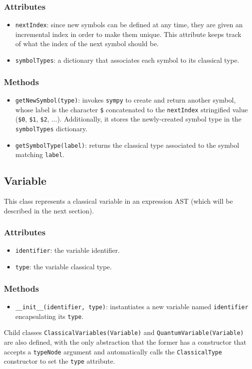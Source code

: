 \documentclass[12pt,a4paper]{report}
\theoremstyle{definition}
\theoremstyle{definition}
\theoremstyle{definition}
\begin{document}
\subsubsection{Attributes}
\begin{itemize}
    \itemsep 0em
    \item \texttt{nextIndex}: since new symbols can be defined at any time, they are given an incremental index in order to make them unique. This attribute keeps track of what the index of the next symbol should be.
    \item \texttt{symbolTypes}: a dictionary that associates each symbol to its classical type.
\end{itemize}
\subsubsection{Methods}
\begin{itemize}
    \itemsep 0em
    \item \texttt{getNewSymbol(type)}: invokes \texttt{sympy} to create and return another symbol, whose label is the character \texttt{\$} concatenated to the \texttt{nextIndex} stringified value (\texttt{\$0}, \texttt{\$1}, \texttt{\$2}, $\ldots$). Additionally, it stores the newly-created symbol type in the \texttt{symbolTypes} dictionary.
    \item \texttt{getSymbolType(label)}: returns the classical type associated to the symbol matching \texttt{label}.
\end{itemize}

\subsection{Variable}
This class represents a classical variable in an expression AST (which will be described in the next section).
\subsubsection{Attributes}
\begin{itemize}
    \itemsep 0em
    \item \texttt{identifier}: the variable identifier.
    \item \texttt{type}: the variable classical type.
\end{itemize}
\subsubsection{Methods}
\begin{itemize}
    \itemsep 0em
    \item \texttt{\_\_init\_\_(identifier, type)}: instantiates a new variable named \texttt{identifier} encapsulating its \texttt{type}.
\end{itemize}
Child classes \texttt{ClassicalVariables(Variable)} and \texttt{QuantumVariable(Variable)} are also defined, with the only abstraction that the former has a constructor that accepts a \texttt{typeNode} argument and automatically calls the \texttt{ClassicalType} constructor to set the \texttt{type} attribute.
\end{document}
